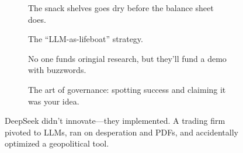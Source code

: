 \begin{figure}[H]
  \centering

  \begin{subfigure}[t]{0.45\textwidth}
  \centering
  \caption*{The snack shelves goes dry before the balance sheet does.}
  \end{subfigure}
  \hfill
  \begin{subfigure}[t]{0.45\textwidth}
  \centering
  \caption*{The “LLM-as-lifeboat” strategy.}
  \end{subfigure}

  \vspace{1em}

  \begin{subfigure}[t]{0.45\textwidth}
  \centering
  \caption*{No one funds oringial research, but they'll fund a demo with buzzwords.}
  \end{subfigure}
  \hfill
  \begin{subfigure}[t]{0.45\textwidth}
  \centering
  \caption*{The art of governance: spotting success and claiming it was your idea.}
  \end{subfigure}

  \caption{DeepSeek didn’t innovate—they implemented. A trading firm pivoted to LLMs, ran on desperation and PDFs, and accidentally optimized a geopolitical tool.}
\end{figure}

